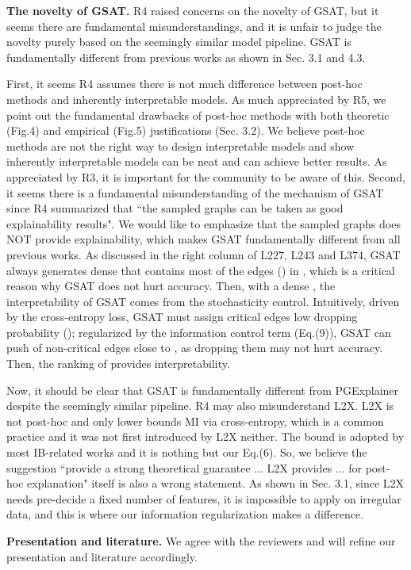 \documentclass{article}
\begin{document}
\textbf{The novelty of GSAT.} R4 raised concerns on the novelty of GSAT, but it seems there are fundamental misunderstandings, and it is unfair to judge the novelty purely based on the seemingly similar model pipeline. GSAT is fundamentally different from previous works as shown in Sec. 3.1 and 4.3.

First, it seems R4 assumes there is not much difference between post-hoc methods and inherently interpretable models. As much appreciated by R5, we point out the fundamental drawbacks of post-hoc methods with both theoretic (Fig.4) and empirical (Fig.5) justifications (Sec. 3.2). We believe post-hoc methods are not the right way to design interpretable models and show inherently interpretable models can be neat and can achieve better results. As appreciated by R3, it is important for the community to be aware of this.
Second, it seems there is a fundamental misunderstanding of the mechanism of GSAT since R4 summarized that ``the sampled graphs can be taken as good explainability results". We would like to emphasize that the sampled graphs  does NOT provide explainability, which makes GSAT fundamentally different from all previous works. As discussed in the right column of L227, L243 and L374, GSAT always generates dense  that contains most of the edges () in , which is a critical reason why GSAT does not hurt accuracy. Then, with a dense , the interpretability of GSAT comes from the stochasticity control. Intuitively, driven by the cross-entropy loss, GSAT must assign critical edges low dropping probability (); regularized by the information control term (Eq.(9)), GSAT can push  of non-critical edges close to , as dropping them may not hurt accuracy. Then, the ranking of  provides interpretability. 

Now, it should be clear that GSAT is fundamentally different from PGExplainer despite the seemingly similar pipeline. 
R4 may also misunderstand L2X. L2X is not post-hoc and only lower bounds MI via cross-entropy, which is a common practice and it was not first introduced by L2X neither. The bound is adopted by most IB-related works and it is nothing but our Eq.(6). So, we believe the suggestion ``provide a strong theoretical guarantee ... L2X provides ... for post-hoc explanation" itself is also a wrong statement. As shown in Sec. 3.1, since L2X needs pre-decide a fixed  number of features, it is impossible to apply on irregular data, and this is where our information regularization makes a difference.

\textbf{Presentation and literature.} We agree with the reviewers and will refine our presentation and literature accordingly.
\end{document}
